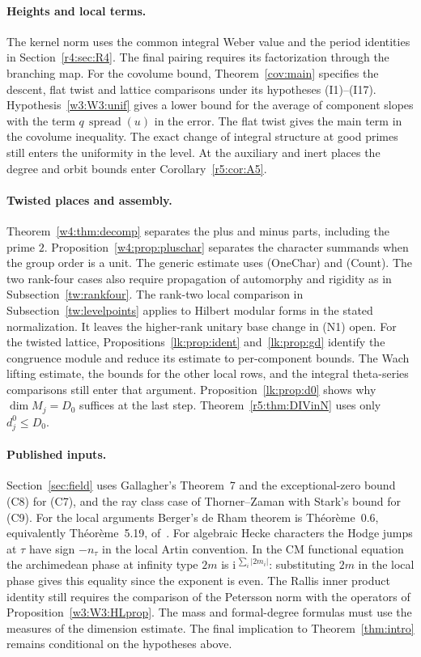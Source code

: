 \paragraph{Heights and local terms.}\label{fr:sec:heights}\label{fr:sec:local}
The kernel norm uses the common integral Weber value and the period
identities in Section~\ref{r4:sec:R4}. The final pairing requires its
factorization through the branching map. For the covolume bound,
Theorem~\ref{cov:main} specifies the descent, flat twist and lattice
comparisons under its hypotheses (I1)--(I17).
Hypothesis~\ref{w3:W3:unif} gives a lower bound for the average of
component slopes with the term $q\,\operatorname{spread}(u)$ in the
error. The flat twist gives the main term in the covolume inequality.
The exact change of integral structure at good primes still enters the
uniformity in the level. At the auxiliary and inert places the degree
and orbit bounds enter Corollary~\ref{r5:cor:A5}.

\paragraph{Twisted places and assembly.}\label{fr:sec:twisted}\label{fr:sec:assembly}
Theorem~\ref{w4:thm:decomp} separates the plus and minus parts, including
the prime $2$. Proposition~\ref{w4:prop:pluschar} separates the character
summands when the group order is a unit. The generic estimate uses
(OneChar) and (Count). The two rank-four cases also require propagation
of automorphy and rigidity as in Subsection~\ref{tw:rankfour}.
The rank-two local comparison in Subsection~\ref{tw:levelpoints} applies
to Hilbert modular forms in the stated normalization. It leaves the
higher-rank unitary base change in (N1) open.
For the twisted lattice, Propositions~\ref{lk:prop:ident} and~\ref{lk:prop:gd}
identify the congruence module and reduce its estimate to per-component
bounds. The Wach lifting estimate, the bounds for the other local rows,
and the integral theta-series comparisons still enter that argument.
Proposition~\ref{lk:prop:d0} shows why $\dim M_j=D_0$ suffices at the
last step. Theorem~\ref{r5:thm:DIVinN} uses only $d^0_j\le D_0$.

\paragraph{Published inputs.}\label{fr:sec:audit}
Section~\ref{sec:field} uses Gallagher's Theorem~7 and the exceptional-zero
bound (C8) for (C7), and the ray class case of Thorner--Zaman with Stark's
bound for (C9). For the local arguments Berger's de Rham theorem is
Th\'eor\`eme~0.6, equivalently Th\'eor\`eme~5.19, of~\cite{berger02}.
For algebraic Hecke characters the Hodge jumps at $\tau$ have sign
$-n_\tau$ in the local Artin convention. In the CM functional equation
the archimedean phase at infinity type $2m$ is
$\mathrm{i}^{\,\sum_i|2m_i|}$: substituting $2m$ in the local phase gives
this equality since the exponent is even.
The Rallis inner product identity still requires the comparison of the
Petersson norm with the operators of Proposition~\ref{w3:W3:HLprop}.
The mass and formal-degree formulas must use the measures of the
dimension estimate. The final implication to Theorem~\ref{thm:intro}
remains conditional on the hypotheses above.
